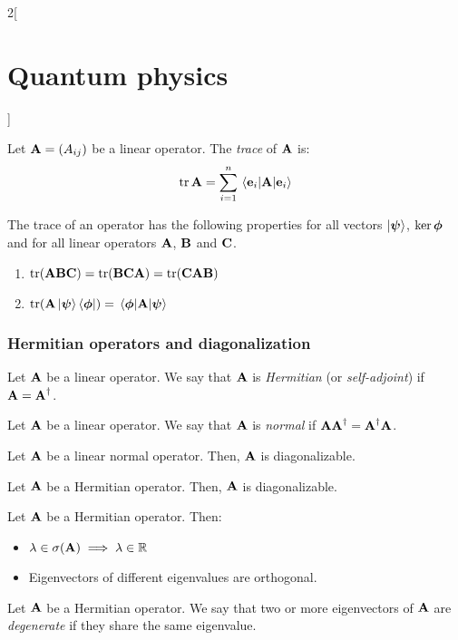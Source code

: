 \documentclass[../../../main.tex]{subfiles}
\begin{document}
\begin{multicols}{2}[\section{Quantum physics}]
\begin{definition}
    Let $\boldsymbol{\mathrm{A}}=(A_{ij})$ be a linear operator. The \emph{trace} of $\boldsymbol{\mathrm{A}}$ is: $$\trace\vf{A}=\sum_{i=1}^n\mel{\vf{e}_i}{\vf{A}}{\vf{e}_i}$$
  \end{definition}
  \begin{proposition}
    The trace of an operator has the following properties for all vectors $\ket{\boldsymbol{\mathrm{\psi}}}$, $\ker{\boldsymbol{\mathrm{\phi}}}$ and for all linear operators $\boldsymbol{\mathrm{A}}$, $\boldsymbol{\mathrm{B}}$ and $\boldsymbol{\mathrm{C}}$.
    \begin{enumerate}
      \item $\trace(\vf{ABC})=\trace(\vf{BCA})=\trace(\vf{CAB})$
      \item $\trace(\vf{A}\ket{\vf\psi}\bra{\vf\phi})=\mel{\vf\phi}{\vf{A}}{\vf\psi}$
    \end{enumerate}
  \end{proposition}
  \subsubsection{Hermitian operators and diagonalization}
  \begin{definition}
    Let $\boldsymbol{\mathrm{A}}$ be a linear operator. We say that $\boldsymbol{\mathrm{A}}$ is \emph{Hermitian} (or \emph{self-adjoint}) if $\boldsymbol{\mathrm{A}}=\boldsymbol{\mathrm{A}}^\dag$.
  \end{definition}
  \begin{definition}
    Let $\boldsymbol{\mathrm{A}}$ be a linear operator. We say that $\boldsymbol{\mathrm{A}}$ is \emph{normal} if $\boldsymbol{\mathrm{A}}\boldsymbol{\mathrm{A}}^\dag=\boldsymbol{\mathrm{A}}^\dag\boldsymbol{\mathrm{A}}$.
  \end{definition}
  \begin{proposition}
    Let $\boldsymbol{\mathrm{A}}$ be a linear normal operator. Then, $\boldsymbol{\mathrm{A}}$ is diagonalizable.
  \end{proposition}
  \begin{corollary}
    Let $\boldsymbol{\mathrm{A}}$ be a Hermitian operator. Then, $\boldsymbol{\mathrm{A}}$ is diagonalizable.
  \end{corollary}
  \begin{proposition}
    Let $\boldsymbol{\mathrm{A}}$ be a Hermitian operator. Then:
    \begin{itemize}
      \item $\lambda\in\sigma(\boldsymbol{\mathrm{A}})\implies\lambda\in\mathbb{R}$
      \item Eigenvectors of different eigenvalues are orthogonal.
    \end{itemize}
  \end{proposition}
  \begin{definition}
    Let $\boldsymbol{\mathrm{A}}$ be a Hermitian operator. We say that two or more eigenvectors of $\boldsymbol{\mathrm{A}}$ are \emph{degenerate} if they share the same eigenvalue.

\end{definition}
\end{multicols}
\end{document}
